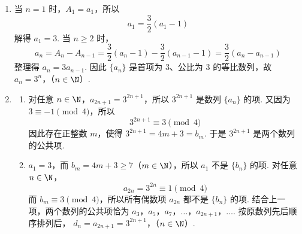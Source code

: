 \begin{solution}
\begin{enumerate}
\item 当 \(n=1\) 时，\(A_1=a_1\)，所以
\[
a_1=\frac{3}{2}(a_1-1)
\]
解得 \(a_1=3\). 当 \(n\geq2\) 时，
\[
a_n=A_n-A_{n-1}
=\frac{3}{2}(a_n-1)-\frac{3}{2}(a_{n-1}-1)
=\frac{3}{2}(a_n-a_{n-1})
\]
整理得 \(a_n=3a_{n-1}\). 因此 \(\{a_n\}\) 是首项为 \(3\)、公比为 \(3\) 的等比数列，故
\(a_n=3^n\)，（\(n\in\N\)）.

\item
\begin{enumerate}
\item 对任意 \(n\in\N\)，\(a_{2n+1}=3^{2n+1}\)，所以 \(3^{2n+1}\) 是数列 \(\{a_n\}\) 的项. 又因为 \(3\equiv-1\pmod4\)，所以
\[
3^{2n+1}\equiv3\pmod4
\]
因此存在正整数 \(m\)，使得 \(3^{2n+1}=4m+3=b_m\). 于是 \(3^{2n+1}\) 是两个数列的公共项.

\item \(a_1=3\)，而 \(b_m=4m+3\geq7\)（\(m\in\N\)），所以 \(a_1\) 不是 \(\{b_n\}\) 的项. 对任意 \(n\in\N\)，
\[
a_{2n}=3^{2n}\equiv1\pmod4
\]
而 \(b_m\equiv3\pmod4\)，所以所有偶数项 \(a_{2n}\) 都不是 \(\{b_n\}\) 的项. 结合上一项，两个数列的公共项恰为
\(a_3\)，\(a_5\)，\(a_7\)，\(\ldots\)，\(a_{2n+1}\)，\(\ldots\).
按原数列先后顺序排列后，
\(d_n=a_{2n+1}=3^{2n+1}\)，（\(n\in\N\)）.
\end{enumerate}
\end{enumerate}
\end{solution}
